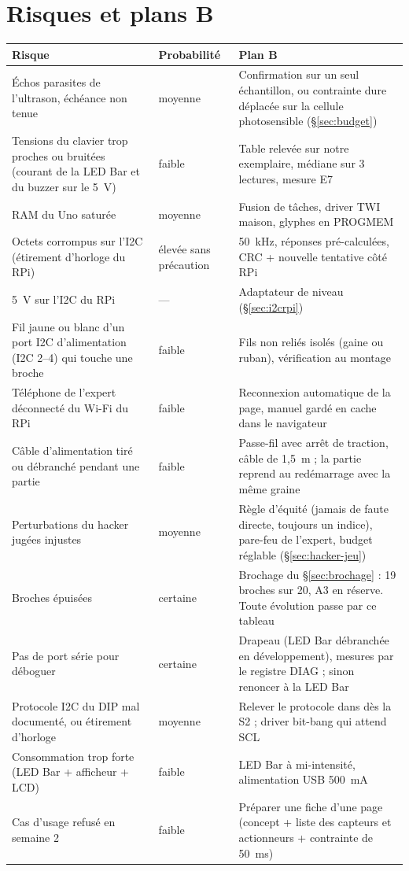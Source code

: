 \documentclass[11pt,a4paper]{article}
\newcommand{\code}[1]{\texttt{\detokenize{#1}}}
\begin{document}
\section{Risques et plans B}
\label{sec:risques}

\begin{center}\small
\begin{tabularx}{\linewidth}{P{5cm}P{2.2cm}L}
\toprule
\textbf{Risque} & \textbf{Probabilité} & \textbf{Plan B} \\
\midrule
Échos parasites de l'ultrason, échéance non tenue & moyenne & Confirmation sur un seul échantillon, ou contrainte dure déplacée sur la cellule photosensible (\S\ref{sec:budget}) \\
Tensions du clavier trop proches ou bruitées (courant de la LED Bar et du buzzer sur le 5~V) & faible & Table relevée sur notre exemplaire, médiane sur 3 lectures, mesure E7 \\
RAM du Uno saturée & moyenne & Fusion de tâches, driver TWI maison, glyphes en PROGMEM \\
Octets corrompus sur l'I2C (étirement d'horloge du RPi) & élevée sans précaution & 50~kHz, réponses pré-calculées, CRC + nouvelle tentative côté RPi \\
5~V sur l'I2C du RPi & --- & Adaptateur de niveau (\S\ref{sec:i2crpi}) \\
Fil jaune ou blanc d'un port I2C d'alimentation (I2C 2--4) qui touche une broche & faible & Fils non reliés isolés (gaine ou ruban), vérification au montage \\
Téléphone de l'expert déconnecté du Wi-Fi du RPi & faible & Reconnexion automatique de la page, manuel gardé en cache dans le navigateur \\
Câble d'alimentation tiré ou débranché pendant une partie & faible & Passe-fil avec arrêt de traction, câble de 1,5~m ; la partie reprend au redémarrage avec la même graine \\
Perturbations du hacker jugées injustes & moyenne & Règle d'équité (jamais de faute directe, toujours un indice), pare-feu de l'expert, budget réglable (\S\ref{sec:hacker-jeu}) \\
Broches épuisées & certaine & Brochage du \S\ref{sec:brochage} : 19 broches sur 20, A3 en réserve. Toute évolution passe par ce tableau \\
Pas de port série pour déboguer & certaine & Drapeau \code{DEBUG_SERIAL} (LED Bar débranchée en développement), mesures par le registre DIAG ; sinon renoncer à la LED Bar \\
Protocole I2C du DIP mal documenté, ou étirement d'horloge & moyenne & Relever le protocole dans \code{Grove_Multi_Switch} dès la S2 ; driver bit-bang qui attend SCL \\
Consommation trop forte (LED Bar + afficheur + LCD) & faible & LED Bar à mi-intensité, alimentation USB 500~mA \\
Cas d'usage refusé en semaine 2 & faible & Préparer une fiche d'une page (concept + liste des capteurs et actionneurs + contrainte de 50~ms) \\
\bottomrule
\end{tabularx}
\end{center}
\end{document}
